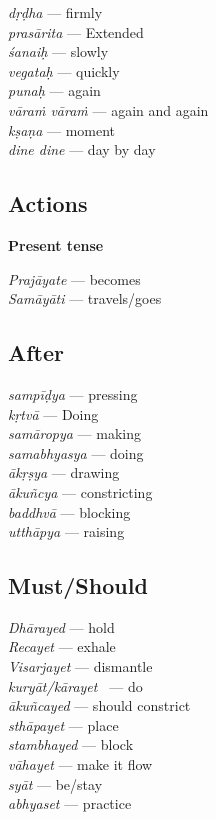 \begin{multicols}{2}
\textit{dṛḍha} --- firmly \\
\textit{prasārita} --- Extended\\
\textit{śanaiḥ} --- slowly \\
\textit{vegataḥ} --- quickly\\ 
\textit{punaḥ} --- again \\
\textit{vāraṁ vāraṁ} --- again and again \\
\textit{kṣaṇa} --- moment \\
\textit{dine dine} --- day by day
\end{multicols}

\subsection*{Actions}

\textbf{Present tense}

\begin{multicols}{2}
\textit{Prajāyate} --- becomes \\
\textit{Samāyāti}  --- travels/goes 
\end{multicols}

\subsection*{After}

\begin{multicols}{2}
\textit{sampīḍya} --- pressing \\
\textit{kṛtvā} --- Doing \\
\textit{samāropya} --- making \\
\textit{samabhyasya} --- doing \\
\textit{ākṛṣya} --- drawing \\
\textit{ākuñcya} --- constricting \\
\textit{baddhvā} --- blocking \\
\textit{utthāpya} --- raising 
\end{multicols}

\subsection*{Must/Should}

\begin{multicols}{2}
\textit{Dhārayed} --- hold \\
\textit{Recayet} --- exhale  \\
\textit{Visarjayet} --- dismantle \\
\textit{kuryāt/kārayet } --- do \\
\textit{ākuñcayed} --- should constrict\\
\textit{sthāpayet} --- place\\
\textit{stambhayed} --- block\\
\textit{vāhayet} --- make it flow\\
\textit{syāt} --- be/stay\\
\textit{abhyaset} --- practice
\end{multicols}

